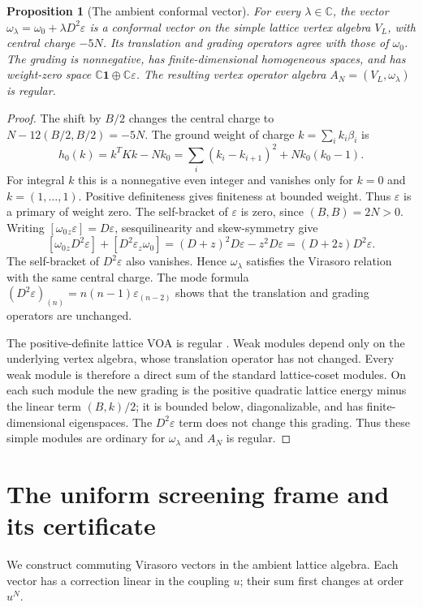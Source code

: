 \documentclass[11pt,a4paper]{article}
\numberwithin{equation}{section}
\newtheorem{proposition}[theorem]{Proposition}
\theoremstyle{definition}\newtheorem{definition}[theorem]{Definition}
\theoremstyle{remark}\newtheorem{remark}[theorem]{Remark}
\newcommand{\one}{\mathbf1}\newcommand{\B}{\mathcal B}\newcommand{\W}{W_N}
\begin{document}
\begin{proposition}[The ambient conformal vector]\label{c:ambient-deformation}
For every $\lambda\in\mathbb C$, the vector
$\omega_\lambda=\omega_0+\lambda D^2\varepsilon$ is a conformal vector
on the simple lattice vertex algebra $V_L$, with central charge $-5N$.
Its translation and grading operators agree with those of $\omega_0$.
The grading is nonnegative, has finite-dimensional homogeneous spaces,
and has weight-zero space $\mathbb C\one\oplus\mathbb C\varepsilon$.
The resulting vertex operator algebra $A_N=(V_L,\omega_\lambda)$ is regular.
\end{proposition}
\begin{proof}
The shift by $B/2$ changes the central charge to
$N-12(B/2,B/2)=-5N$.  The ground weight of charge
$k=\sum_i k_i\beta_i$ is
\begin{equation}\label{c:ambient-weight}
 h_0(k)=k^TKk-Nk_0
 =\sum_i(k_i-k_{i+1})^2+Nk_0(k_0-1).
\end{equation}
For integral $k$ this is a nonnegative even integer and vanishes only
for $k=0$ and $k=(1,\ldots,1)$.  Positive definiteness gives finiteness
at bounded weight.  Thus $\varepsilon$ is a primary of weight zero.
The self-bracket of $\varepsilon$ is zero, since $(B,B)=2N>0$.
Writing $[\omega_0{}_z\varepsilon]=D\varepsilon$, sesquilinearity
and skew-symmetry give
\[
 [\omega_0{}_z D^2\varepsilon]+[D^2\varepsilon{}_z\omega_0]
 =(D+z)^2D\varepsilon-z^2D\varepsilon
 =(D+2z)D^2\varepsilon.
\]
The self-bracket of $D^2\varepsilon$ also vanishes.  Hence
$\omega_\lambda$ satisfies the Virasoro relation with the same central
charge.  The mode formula
$(D^2\varepsilon)_{(n)}=n(n-1)\varepsilon_{(n-2)}$ shows that the
translation and grading operators are unchanged.

The positive-definite lattice VOA is regular
\cite[Theorem 3.16]{c:DLMRegular}.  Weak modules depend only on the
underlying vertex algebra, whose translation operator has not changed.
Every weak module is therefore a direct sum of the standard lattice-coset
modules.  On each such module the new grading is the positive quadratic
lattice energy minus the linear term $(B,k)/2$; it is bounded below,
diagonalizable, and has finite-dimensional eigenspaces.  The
$D^2\varepsilon$ term does not change this grading.  Thus these simple
modules are ordinary for $\omega_\lambda$ and $A_N$ is regular.
\end{proof}


\section{The uniform screening frame and its certificate}\label{c:app:frame}
We construct commuting Virasoro vectors in the ambient lattice algebra.
Each vector has a correction linear in the coupling $u$; their sum
first changes at order $u^N$.
\end{document}
